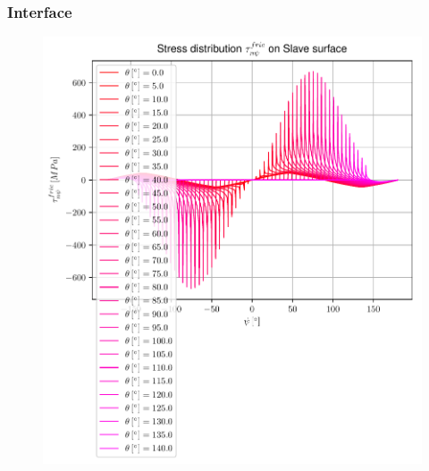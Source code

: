 \documentclass[first,firstsupp,lastsupp,handout,last,hyperref,table]{ETHclass}
\begin{document}
\begin{frame}
\frametitle{\vspace{0.35cm}\scriptsize Interface}
\vspace{-0.85cm}
\begin{figure}
\includegraphics[height=0.9\textheight]{2017-03-03_AbqRunSummary_AllFricShearOnSlave.pdf}
\end{figure}
\end{frame}
\end{document}
